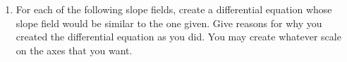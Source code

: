 \begin{enumerate}
\item For each of the following slope fields, create a differential equation whose slope field would be similar to the one given. Give reasons for why you created the differential equation as you did. You may create whatever scale on the axes that you want. \label{06HWproblem2} \\
\end{enumerate}
